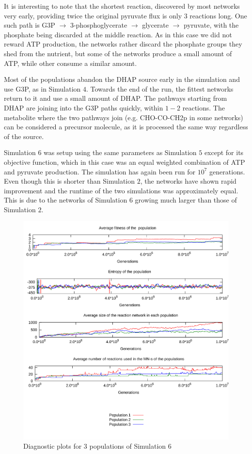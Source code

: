 \documentclass[a4paper,12pt]{article}
\begin{document}
It is interesting to note that the shortest reaction, discovered by most networks very early, providing twice the original pyruvate flux is only $3$ reactions long. One such path is G3P $\rightarrow$ 3-phosphoglycerate $\rightarrow$ glycerate $\rightarrow$ pyruvate, with the phosphate being discarded at the middle reaction. 
As in this case we did not reward ATP production, the networks rather discard the phosphate groups they shed from the nutrient, but some of the networks produce a small amount of ATP, while other consume a similar amount. 

Most of the populations abandon the DHAP source early in the simulation and use G3P, as in Simulation $4$. Towards the end of the run, the fittest networks return to it and use a small amount of DHAP. The pathways starting from DHAP are joining into the G3P paths quickly, within $1-2$ reactions. The metabolite where the two pathways join (e.g. CHO-CO-CH2p in some networks) can be considered a precursor molecule, as it is processed the same way regardless of the source. 




Simulation $6$ was setup using the same parameters as Simulation $5$ except for its objective function, which in this case was an equal weighted combination of ATP and pyruvate production. The simulation has again been run for $10^7$ generations. Even though this is shorter than Simulation $2$, the networks have shown rapid improvement and the runtime of the two simulations was approximately equal. This is due to the networks of Simulation $6$ growing much larger than those of Simulation $2$. 

\begin{figure}[htpb]
	\centering
	\includegraphics[width=0.8\linewidth]{simulationequalatppyruvate.pdf}
	\caption{Diagnostic plots for 3 populations of Simulation 6}
	\label{fig:simulationequalatppyruvate}
\end{figure}
\end{document}
